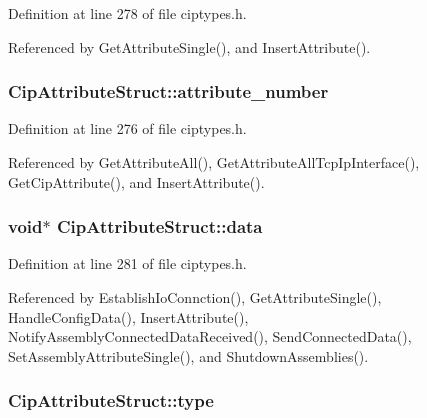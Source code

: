 \-Definition at line 278 of file ciptypes.\-h.



\-Referenced by \-Get\-Attribute\-Single(), and \-Insert\-Attribute().

\hypertarget{structCipAttributeStruct_a8ef9e76a42d35217da662d4e583ecde7}{
\subsubsection[{attribute\-\_\-number}]{ {\bf \-Cip\-Attribute\-Struct\-::attribute\-\_\-number}}}\label{d4/d62/structCipAttributeStruct_a8ef9e76a42d35217da662d4e583ecde7}


\-Definition at line 276 of file ciptypes.\-h.



\-Referenced by \-Get\-Attribute\-All(), \-Get\-Attribute\-All\-Tcp\-Ip\-Interface(), \-Get\-Cip\-Attribute(), and \-Insert\-Attribute().

\hypertarget{structCipAttributeStruct_a859d8bdd91ff42b1ce0ff5f8053d2b40}{
\subsubsection[{data}]{\setlength{\rightskip}{0pt plus 5cm}void$\ast$ {\bf \-Cip\-Attribute\-Struct\-::data}}}\label{d4/d62/structCipAttributeStruct_a859d8bdd91ff42b1ce0ff5f8053d2b40}


\-Definition at line 281 of file ciptypes.\-h.



\-Referenced by \-Establish\-Io\-Connction(), \-Get\-Attribute\-Single(), \-Handle\-Config\-Data(), \-Insert\-Attribute(), \-Notify\-Assembly\-Connected\-Data\-Received(), \-Send\-Connected\-Data(), \-Set\-Assembly\-Attribute\-Single(), and \-Shutdown\-Assemblies().

\hypertarget{structCipAttributeStruct_a5882627a9fc1b118b1c34bf4da8a66cd}{
\subsubsection[{type}]{ {\bf \-Cip\-Attribute\-Struct\-::type}}}\label{d4/d62/structCipAttributeStruct_a5882627a9fc1b118b1c34bf4da8a66cd}


